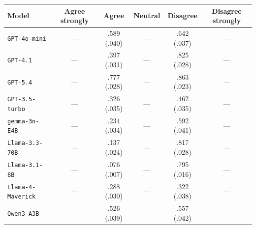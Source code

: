 \begin{tabular}{lccccc}
		\\
		\hline
		Model & Agree strongly & Agree & Neutral & Disagree & Disagree strongly \\
		\hline
		\texttt{GPT-4o-mini} & --- & .589 (.040) & --- & .642 (.037) & --- \\
		\texttt{GPT-4.1} & --- & .397 (.031) & --- & .825 (.028) & --- \\
		\texttt{GPT-5.4} & --- & .777 (.028) & --- & .863 (.023) & --- \\
		\texttt{GPT-3.5-turbo} & --- & .326 (.035) & --- & .462 (.035) & --- \\
		\texttt{gemma-3n-E4B} & --- & .234 (.034) & --- & .592 (.041) & --- \\
		\texttt{Llama-3.3-70B} & --- & .137 (.024) & --- & .817 (.028) & --- \\
		\texttt{Llama-3.1-8B} & --- & .076 (.007) & --- & .795 (.016) & --- \\
		\texttt{Llama-4-Maverick} & --- & .288 (.030) & --- & .322 (.038) & --- \\
		\texttt{Qwen3-A3B} & --- & .526 (.039) & --- & .557 (.042) & --- \\
		\hline
\end{tabular}
